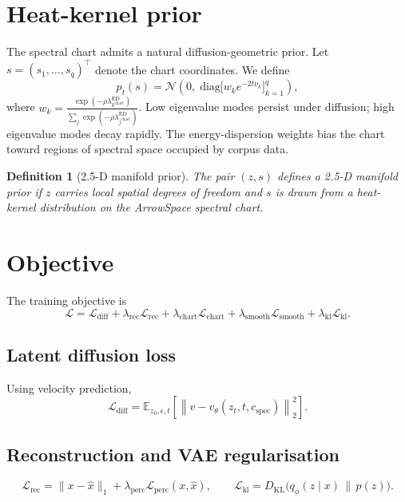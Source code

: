 \documentclass[11pt]{article}
\newtheorem{definition}{Definition}
\newcommand{\ed}{\lambda^{\mathrm{ED}}}
\begin{document}
    \section{Heat-kernel prior}
    \label{sec:heat_kernel}
    The spectral chart admits a natural diffusion-geometric prior. Let
    $s = (s_1,\ldots,s_q)^\top$ denote the chart coordinates. We
    define
    \[p_t(s) = \mathcal{N}\!\left( 0,\;
    \mathrm{diag}\bigl[w_k e^{-2t\nu_k}\bigr]_{k=1}^q \right),\]
    where $w_k = \frac{\exp(-\rho \ed_{k^{\mathrm{chart}}})} {\sum_j
    \exp(-\rho \ed_{j^{\mathrm{chart}}})}$. Low eigenvalue modes
    persist under diffusion; high eigenvalue modes decay rapidly. The
    energy-dispersion weights bias the chart toward regions of
    spectral space occupied by corpus data.

    \begin{definition}[2.5-D manifold prior]
    The pair $(z,s)$ defines a 2.5-D manifold prior if $z$ carries
    local spatial degrees of freedom and $s$ is drawn from a
    heat-kernel distribution on the ArrowSpace spectral chart.
    \end{definition}

    \section{Objective}
    \label{sec:objective}
    The training objective is
    \[\mathcal{L} = \mathcal{L}_{\mathrm{diff}} +
    \lambda_{\mathrm{rec}}\mathcal{L}_{\mathrm{rec}} +
    \lambda_{\mathrm{chart}}\mathcal{L}_{\mathrm{chart}} +
    \lambda_{\mathrm{smooth}}\mathcal{L}_{\mathrm{smooth}} +
    \lambda_{\mathrm{kl}}\mathcal{L}_{\mathrm{kl}}.\]

    \subsection{Latent diffusion loss}
    Using velocity prediction,
    \[\mathcal{L}_{\mathrm{diff}} = \mathbb{E}_{z_0,\epsilon,t}
    \left[ \left\| v - v_\theta(z_t,t,c_{\mathrm{spec}}) \right\|_2^2
    \right].\]

    \subsection{Reconstruction and VAE regularisation}
    \[\mathcal{L}_{\mathrm{rec}} = \|x-\hat x\|_1 +
    \lambda_{\mathrm{perc}}\mathcal{L}_{\mathrm{perc}}(x,\hat x),\qquad
    \mathcal{L}_{\mathrm{kl}} = D_{\mathrm{KL}}\!\bigl(q_\phi(z \mid
    x)\,\|\,p(z)\bigr).\]
\end{document}
